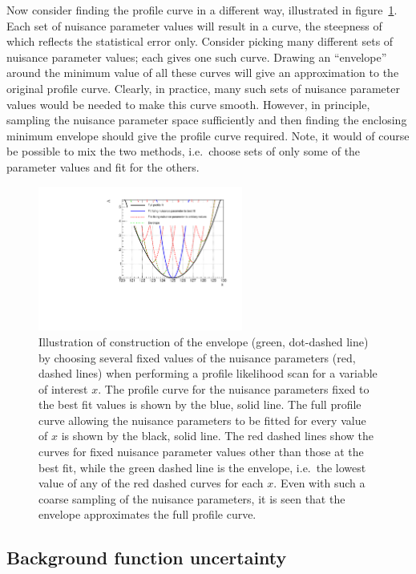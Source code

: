 Now consider finding the profile curve in a different way, illustrated
in figure~\ref{fig:concept:cartoon}.
Each set of nuisance
parameter values will result in a curve, the steepness of which reflects
the statistical error only. Consider picking many different sets of nuisance
parameter values; each gives one such curve. Drawing an ``envelope'' around the
minimum \nll value of all these curves will give an approximation to the
original profile curve. Clearly, in practice, many such sets of nuisance
parameter values would be needed to make this curve smooth. However, in
principle, sampling the nuisance parameter space sufficiently
and then finding the enclosing
minimum envelope should give the profile curve required.
Note, it would of course be possible to mix the two methods, i.e.~choose
sets of only some of the parameter values and fit for the others.
%
\begin{figure}[tbp]
\centering
\includegraphics[width=0.6\textwidth]{concept/envelope_cartoon.pdf}
\caption{Illustration of construction of the envelope (green, dot-dashed line)
by choosing several fixed values of the nuisance parameters (red, dashed lines)
when performing a profile likelihood scan for a variable of interest $x$.
The \nll profile curve for the nuisance parameters fixed to the best fit
values is shown by the blue, solid line. The full profile curve allowing the
nuisance parameters to be fitted for every value of $x$ is shown by the
black, solid line. The red dashed lines show the \nll curves for fixed
nuisance parameter values other than those at the best fit, while the green
dashed line is the envelope, i.e.~the lowest value of any of the red dashed
curves for each $x$. Even with such a coarse sampling of the nuisance
parameters, it is seen that the envelope approximates the full profile curve.}
\label{fig:concept:cartoon}
\end{figure}

\subsection{Background function uncertainty}
\label{sec:concept:functions}

